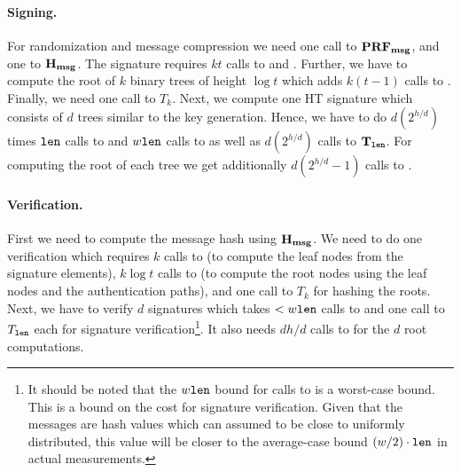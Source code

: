 \paragraph{Signing.} For randomization and message compression we need one call to
$\mathbf{PRF_{msg}}$, and one to $\mathbf{H_{msg}}$. The \fors signature requires 
$kt$ calls to \sphincsPRF and \sphincsF. Further, we have to compute the root of 
$k$ binary trees of height $\log t$ which adds $k(t - 1)$ calls to \sphincsH. 
Finally, we need one call to $T_k$. Next, we compute one HT signature which 
consists of $d$ trees similar to the key generation. Hence, we have to do 
$d(2^{h/d})$ times $\texttt{len}$ calls to \sphincsPRF and $w\texttt{len}$ calls to \sphincsF
as well as $d(2^{h/d})$ calls to $\mathbf{T}_\texttt{len}$. For computing 
the root of each tree we get additionally $d(2^{h/d} - 1)$ calls to \sphincsH.

\paragraph{Verification.} First we need to compute the message hash using 
$\mathbf{H_{msg}}$. We need to do one \fors verification which requires
$k$ calls to %
\sphincsF (to compute the leaf nodes from the signature elements), $k\log t$ calls to \sphincsH (to compute the root nodes using the leaf nodes and the authentication paths), and one call
to $T_k$ for hashing the roots. Next, we have to verify $d$ \xmss signatures 
which takes $<w\texttt{len}$ calls to \sphincsF and one call to $T_\texttt{len}$ each for \wotsp
signature verification\footnote{It should be noted that the $w\texttt{len}$ bound for calls to \sphincsF is a worst-case bound. This is a bound on the cost for \wots signature verification. Given that the messages are hash values which can assumed to be close to uniformly distributed, this value will be closer to the average-case bound $(w/2) \cdot \texttt{len}$ in actual measurements.}. It also needs $dh/d$ calls to \sphincsH for the $d$ 
root computations.

